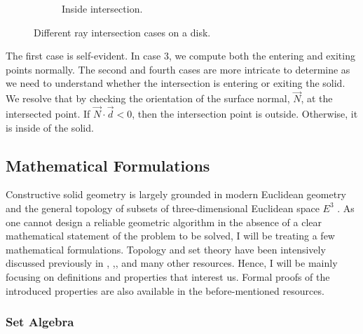\documentclass[a4paper,11pt,oneside]{article}
\begin{document}
\begin{figure}[ht]
\begin{subfigure}[b]{0.4\textwidth}
		\caption{Inside intersection.}
		\label{sec3.1:inside-intersection}
	\end{subfigure}
	\caption{Different ray intersection cases on a disk.}
	\label{sec3.1:intersection-cases}
\end{figure}


The first case is self-evident. In case 3, we compute both the entering and exiting points normally. The second and fourth cases are more intricate to determine as we need to understand whether the intersection is entering or exiting the solid. We resolve that by checking the orientation of the surface normal, $\vec{N}$, at the intersected point. If $\vec{N}\cdot\vec{d} < 0$, then the intersection point is outside. Otherwise, it is inside of the solid.


\subsection{Mathematical Formulations}
  
Constructive solid geometry is largely grounded in modern Euclidean geometry and the general topology of subsets of three-dimensional Euclidean space $E^3$ \cite{Requicha1978MathematicalFO}. As one cannot design a reliable geometric algorithm in the absence of a clear mathematical statement of the problem to be solved, I will be treating a few mathematical formulations. Topology and set theory have been intensively discussed previously in \cite{Requicha1978MathematicalFO}, \cite{tilove1977a},\cite{lachlan_srebrny_zarach_1977}, and many other resources. Hence, I will be mainly focusing on definitions and properties that interest us. Formal proofs of the introduced properties are also available in the before-mentioned resources.
  
\subsubsection{Set Algebra}
  
\theoremstyle{definition}
\newtheorem{definition}{Definition}[section]
  
\theoremstyle{property}
\newtheorem{property}{Property}[section]
    
\theoremstyle{remark}
\newtheorem*{remark}{Remark}
      
\end{document}
